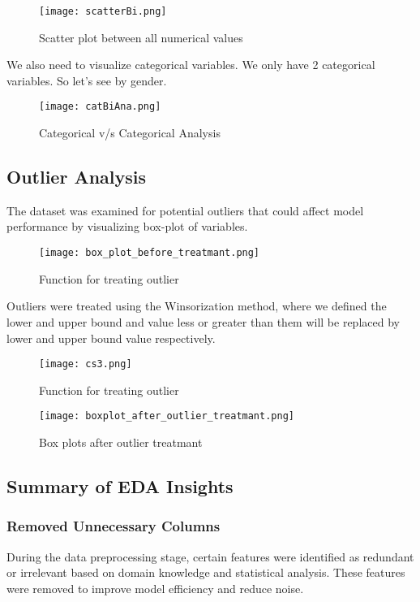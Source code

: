 \documentclass[12pt]{article}
\begin{document}
\begin{figure}[H]
    \centering
    \texttt{[image: scatterBi.png]}
    \caption{Scatter plot between all numerical values}
    \label{fig:example}
\end{figure}

We also need to visualize categorical variables. We only have 2 categorical variables. So let's see by gender.

\begin{figure}[H]
    \centering
    \texttt{[image: catBiAna.png]}
    \caption{Categorical v/s Categorical Analysis}
    \label{fig:example}
\end{figure}

\subsection{Outlier Analysis}
The dataset was examined for potential outliers that could affect model performance by visualizing box-plot of variables.
\begin{figure}[H]
    \centering
    \texttt{[image: box\_plot\_before\_treatmant.png]}
    \caption{Function for treating outlier}
    \label{fig:example}
\end{figure}

Outliers were treated using the Winsorization method, where we defined the lower and upper bound and value less or greater than them will be replaced by lower and upper bound value respectively. 

\begin{figure}[H]
    \centering
    \texttt{[image: cs3.png]}
    \caption{Function for treating outlier}
    \label{fig:example}
\end{figure}


\begin{figure}[H]
    \centering
    \texttt{[image: boxplot\_after\_outlier\_treatmant.png]}
    \caption{Box plots after outlier treatmant }
    \label{fig:example}
\end{figure}

\subsection{Summary of EDA Insights}

\subsubsection{Removed Unnecessary Columns}
During the data preprocessing stage, certain features were identified as redundant or irrelevant based on domain knowledge and statistical analysis. These features were removed to improve model efficiency and reduce noise.
\end{document}
